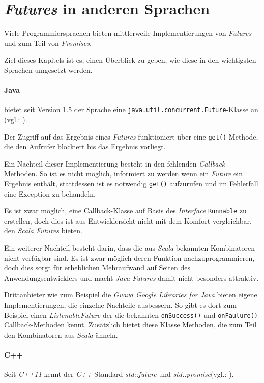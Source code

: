\section{\emph{Futures} in anderen Sprachen}

Viele Programmiersprachen bieten mittlerweile Implementierungen von
\emph{Futures} und zum Teil von \emph{Promises}.

Ziel dieses Kapitels ist es, einen Überblick zu geben, wie diese
in den wichtigsten Sprachen umgesetzt werden.

\paragraph{Java} bietet seit Version 1.5 der Sprache eine 
\texttt{java.util.concurrent.Future}-Klasse an (vgl.: \cite{javadocfuture}).

Der Zugriff auf das Ergebnis eines \emph{Futures} funktioniert über
eine \texttt{get()}-Methode, die den Aufrufer blockiert bis das
Ergebnis vorliegt.

Ein Nachteil dieser Implementierung besteht in den fehlenden
\emph{Callback}-Methoden. So ist es nicht möglich, informiert
zu werden wenn ein \emph{Future} ein Ergebnis enthält, stattdessen
ist es notwendig \texttt{get()} aufzurufen und im Fehlerfall
eine Exception zu behandeln.

Es ist zwar möglich, eine Callback-Klasse auf Basis des \emph{Interface}
\texttt{Runnable} zu erstellen, doch dies ist aus Entwicklersicht
nicht mit dem Komfort vergleichbar, den \emph{Scala Futures} bieten.

Ein weiterer Nachteil besteht darin, dass die aus \emph{Scala} bekannten
Kombinatoren nicht verfügbar sind. Es ist zwar möglich deren Funktion
nachzuprogrammieren, doch dies sorgt für erheblichen Mehraufwand
auf Seiten des Anwendungsentwicklers und macht \emph{Java Futures}
damit nicht besonders attraktiv.

Drittanbieter wie zum Beispiel die \emph{Guava Google Libraries for Java}
bieten eigene Implementierungen, die einzelne Nachteile ausbessern.
So gibt es dort zum Beispiel einen \emph{ListenableFuture} der die
bekannten \texttt{onSuccess()} und \texttt{onFaulure()}-Callback-Methoden
kennt. Zusätzlich bietet diese Klasse Methoden, die zum Teil den
Kombinatoren aus \emph{Scala} ähneln.

\paragraph{C++} Seit \emph{C++11} kennt der \emph{C++}-Standard
\emph{std::future} und \emph{std::promise}(vgl.: \cite{cpp11FAQ}).


